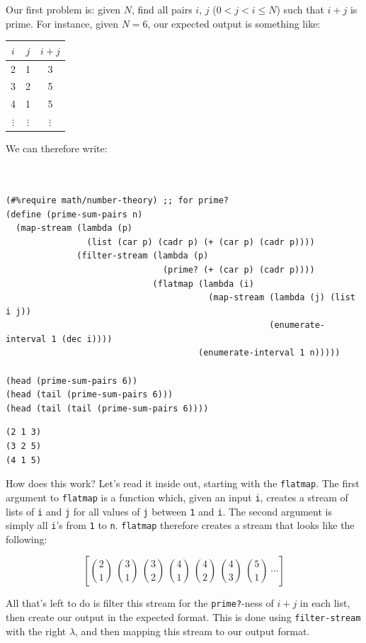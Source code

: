 \documentclass[9pt]{report}
\begin{document}
Our first problem is: given \(N\), find all pairs \(i\), \(j\) (\(0< j <
    i \leq N\)) such that \(i+j\) is prime. For instance, given \(N=6\),
our expected output is something like:

\begin{center}
\begin{tabular}{ccc}
\toprule
\(i\) & \(j\) & \(i+j\)\\
\midrule
2 & 1 & 3\\
3 & 2 & 5\\
4 & 1 & 5\\
\(\vdots\) & \(\vdots\) & \(\vdots\)\\
\bottomrule
\end{tabular}
\end{center}

We can therefore write:

\begin{verbatim}


(#%require math/number-theory) ;; for prime?
(define (prime-sum-pairs n)
  (map-stream (lambda (p)
                (list (car p) (cadr p) (+ (car p) (cadr p))))
              (filter-stream (lambda (p)
                               (prime? (+ (car p) (cadr p))))
                             (flatmap (lambda (i)
                                        (map-stream (lambda (j) (list i j))
                                                    (enumerate-interval 1 (dec i))))
                                      (enumerate-interval 1 n)))))

(head (prime-sum-pairs 6))
(head (tail (prime-sum-pairs 6)))
(head (tail (tail (prime-sum-pairs 6))))
\end{verbatim}

\begin{verbatim}
(2 1 3)
(3 2 5)
(4 1 5)
\end{verbatim}


How does this work? Let's read it inside out, starting with the
\texttt{flatmap}. The first argument to \texttt{flatmap} is a function which,
given an input \texttt{i}, creates a stream of lists of \texttt{i} and \texttt{j} for
all values of \texttt{j} between \texttt{1} and \texttt{i}. The second argument is
simply all \texttt{i}'s from \texttt{1} to \texttt{n}. \texttt{flatmap} therefore creates a
stream that looks like the following:

$$\left[
   \binom{2}{1}~\binom{3}{1}~\binom{3}{2}~\binom{4}{1}~\binom{4}{2}~\binom{4}{3}~\binom{5}{1}~\cdots
   \right]$$

All that's left to do is filter this stream for the \texttt{prime?}-ness
of \(i+j\) in each list, then create our output in the expected
format. This is done using \texttt{filter-stream} with the right
\(\lambda\), and then mapping this stream to our output format.
\end{document}
